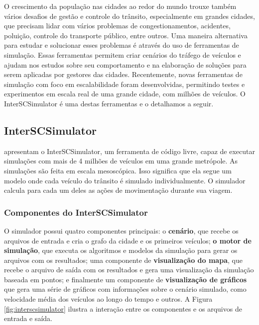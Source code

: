   O crescimento da população nas cidades ao redor do mundo trouxe também vários
desafios de gestão e controle do trânsito, especialmente em grandes cidades,
que precisam lidar com vários problemas de congestionamentos, acidentes,
poluição, controle do transporte público, entre outros. Uma maneira alternativa
para estudar e solucionar esses problemas é através do uso de ferramentas de
simulação. Essas ferramentas permitem criar cenários do tráfego de veículos e
ajudam nos estudos sobre seu comportamento e na elaboração de soluções para
serem aplicadas por gestores das cidades. Recentemente, novas ferramentas de
simulação com foco em escalabilidade foram desenvolvidas, permitindo testes e
experimentos em escala real de uma grande cidade, com milhões de veículos. O
InterSCSimulator é uma destas ferramentas e o detalhamos a seguir.

\subsection{InterSCSimulator}
\label{sec:interscsimulator}

\citet{mabs2017} apresentam o InterSCSimulator, um ferramenta de código livre,
capaz de executar simulações com mais de 4 milhões de veículos em uma grande
metrópole.  As simulações são feita em escala mesoscópica. Isso significa que
ela segue um modelo onde cada veículo do trânsito é simulado individualmente. O
simulador calcula para cada um deles as ações de movimentação durante sua
viagem.

\subsubsection{Componentes do InterSCSimulator}

  O simulador possui quatro componentes principais: o \textbf{cenário}, que
recebe os arquivos de entrada e cria o grafo da cidade e os primeiros veículos;
\textbf{o motor de simulação}, que executa os algoritmos e modelos da simulação
para gerar os arquivos com os resultados; uma componente de
\textbf{visualização do mapa}, que recebe o arquivo de saída com os resultados
e gera uma visualização da simulação baseada em pontos; e finalmente um
componente de \textbf{visualização de gráficos} que gera uma série de gráficos
com informações sobre o cenário simulado, como velocidade média dos veículos ao
longo do tempo e outros. A Figura \ref{fig:interscsimulator} ilustra a
interação entre os componentes e os arquivos de entrada e saída.


